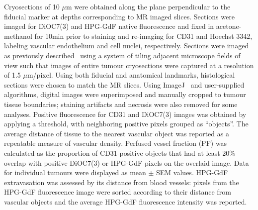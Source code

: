 Cryosections of 10 $\mu$m were obtained along the plane perpendicular to the fiducial marker at depths corresponding to MR imaged slices.
Sections were imaged for DiOC7(3) and \acs{HPG-GdF} native fluorescence and fixed in acetone-methanol for 10min prior to staining and re-imaging for \acs{CD31} and Hoechst 3342, labeling vascular endothelium and cell nuclei, respectively.
Sections were imaged as previously described~\cite{Kyle:2007ch} using a system of tiling adjacent microscope fields of view such that images of entire tumour cryosections were captured at a resolution of 1.5 $\mu$m/pixel.
Using both fiducial and anatomical landmarks, histological sections were chosen to match the MR slices.
Using ImageJ~\cite{Collins:2007jr} and user-supplied algorithms, digital images were superimposed and manually cropped to tumour tissue boundaries; staining artifacts and necrosis were also removed for some analyses.
Positive fluorescence for \acs{CD31} and DiOC7(3) images was obtained by applying a threshold, with neighboring positive pixels grouped as ``objects''.
The average distance of tissue to the nearest vascular object was reported as a repeatable measure of vascular density.
Perfused vessel fraction (PF) was calculated as the proportion of \acs{CD31}-positive objects that had at least 20\% overlap with positive DiOC7(3) or \acs{HPG-GdF} pixels on the overlaid image.
Data for individual tumours were displayed as mean $\pm$ SEM values.
HPG-GdF extravasation was assessed by its distance from blood vessels: pixels from the \acs{HPG-GdF} fluorescence image were sorted according to their distance from vascular objects and the average \acs{HPG-GdF} fluorescence intensity was reported.

